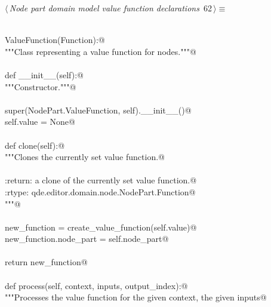 \documentclass[
    a4paper,      %
    10pt,         %
    openright,    %
    notitlepage,  %
    parskip=half, %
]{scrreprt}       %
\theoremstyle{definition}                    %
\begin{document}
\begin{flushleft} \small
\begin{minipage}{\linewidth}\label{scrap104}\raggedright\small
{} $\langle\,${\itshape Node part domain model value function declarations}\nobreak\ {\footnotesize {62}}$\,\rangle\equiv$
\vspace{-1exm}
\begin{list}{}{} \item
\mbox{}\lstinline@@\\
\mbox{}\lstinline@class ValueFunction(Function):@\\
\mbox{}\lstinline@    """Class representing a value function for nodes."""@\\
\mbox{}\lstinline@@\\
\mbox{}\lstinline@    def __init__(self):@\\
\mbox{}\lstinline@        """Constructor."""@\\
\mbox{}\lstinline@@\\
\mbox{}\lstinline@        super(NodePart.ValueFunction, self).__init__()@\\
\mbox{}\lstinline@        self.value = None@\\
\mbox{}\lstinline@@\\
\mbox{}\lstinline@    def clone(self):@\\
\mbox{}\lstinline@        """Clones the currently set value function.@\\
\mbox{}\lstinline@@\\
\mbox{}\lstinline@        :return: a clone of the currently set value function.@\\
\mbox{}\lstinline@        :rtype: qde.editor.domain.node.NodePart.Function@\\
\mbox{}\lstinline@        """@\\
\mbox{}\lstinline@@\\
\mbox{}\lstinline@        new_function = create_value_function(self.value)@\\
\mbox{}\lstinline@        new_function.node_part = self.node_part@\\
\mbox{}\lstinline@@\\
\mbox{}\lstinline@        return new_function@\\
\mbox{}\lstinline@@\\
\mbox{}\lstinline@    def process(self, context, inputs, output_index):@\\
\mbox{}\lstinline@        """Processes the value function for the given context, the given inputs@\\

\end{list}
\end{minipage}
\end{flushleft}
\end{document}
